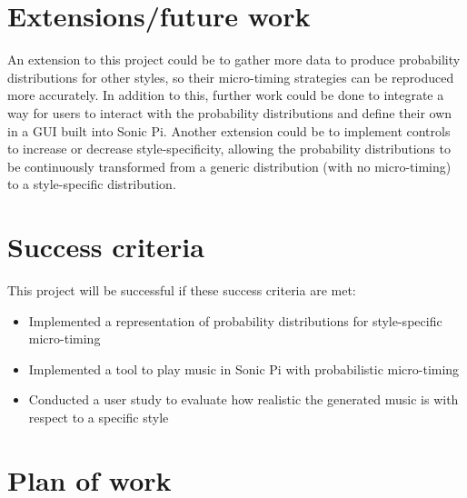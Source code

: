 \documentclass[12pt,twoside,openright]{report}
\begin{document}
\begin{refsection}
\section*{Extensions/future work}

An extension to this project could be to gather more data to produce probability
distributions for other styles, so their micro-timing strategies can be
reproduced more accurately. In addition to this, further work could be done to
integrate a way for users to interact with the probability distributions and
define their own in a GUI built into Sonic Pi. Another extension could be to
implement controls to increase or decrease style-specificity, allowing the
probability distributions to be continuously transformed from a generic
distribution (with no micro-timing) to a style-specific distribution.



\section*{Success criteria}

This project will be successful if these success criteria are met:

\begin{itemize}
	\item Implemented a representation of probability distributions for
style-specific micro-timing
	\item Implemented a tool to play music in Sonic Pi with probabilistic
micro-timing
	\item Conducted a user study to evaluate how realistic the generated music is
with respect to a specific style
\end{itemize}



\section*{Plan of work}


\end{refsection}
\end{document}
